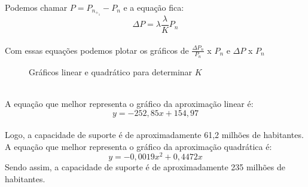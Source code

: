 \documentclass[a4paper]{article}
\begin{document}
\\
Podemos chamar \Delta $P = P_n_+_1 - P_n$ e a equa\c{c}\~{a}o fica:
\begin{equation}
\Delta P = \lambda  \frac{\lambda}{K}P_n
\end{equation}
\\
Com essas equa\c{c}\~{o}es podemos plotar os gr\'{a}ficos de $\frac{\Delta P_n}{P_n}$ x $P_n$ e $\Delta P$ x $P_n$
\\
\begin{figure}[h]
\label{grafLinear}
\caption{Gr\'{a}ficos linear e quadr\'{a}tico para determinar $K$}
{}
\end{figure}
\\
A equa\c{c}\~{a}o que melhor representa o gr\'{a}fico da aproxima\c{c}\~{a}o linear \'{e}: 
\begin{equation}
y = -252,85x +154,97
\end{equation}
\\
Logo, a capacidade de suporte \'{e} de aproximadamente 61,2 milh\~{o}es de habitantes.
\\
A equa\c{c}\~{a}o que melhor representa o gr\'{a}fico da aproxima\c{c}\~{a}o quadr\'{a}tica \'{e}: 
\begin{equation}
y = - 0,0019x^2 + 0,4472x
\end{equation}
Sendo assim, a capacidade de suporte \'{e} de aproximadamente 235 milh\~{o}es de habitantes.
\\
\end{document}
